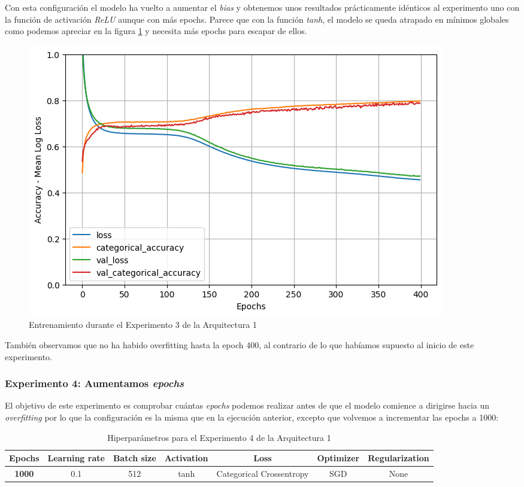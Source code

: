 \documentclass{article}
\begin{document}
			Con esta configuraci\'on el modelo ha vuelto a aumentar el \textit{bias} y obtenemos unos resultados pr\'acticamente id\'enticos al experimento uno con la funci\'on de activaci\'on \textit{ReLU} aunque con m\'as epochs. Parece que con la funci\'on \textit{tanh}, el modelo se queda atrapado en m\'inimos globales como podemos apreciar en la figura \ref{d-tr-a1-e3} y necesita m\'as epochs para escapar de ellos.\\
			
			\begin{figure}[!h]
				\begin{center}
					\includegraphics[scale=0.5]{d-tr-a1-e3.png}		
					\caption{Entrenamiento durante el Experimento 3 de la Arquitectura 1}	
					\label{d-tr-a1-e3}
				\end{center}
			\end{figure}
			
			Tambi\'en observamos que no ha habido overfitting hasta la epoch 400, al contrario de lo que hab\'iamos supuesto al inicio de este experimento.
			
		\subsubsection{Experimento 4: Aumentamos \textit{epochs}}
		\label{d-s-a1-e4}
			El objetivo de este experimento es comprobar cu\'antas \textit{epochs} podemos realizar antes de que el modelo comience a dirigirse hacia un \textit{overfitting} por lo que la configuraci\'on es la misma que en la ejecuci\'on anterior, excepto que volvemos a incrementar las epochs a 1000:
			\begin{table}[!h]
				\begin{center}
					\begin{tabular}{| c | c | c | c | c | c | c |}
						\textbf{Epochs} & \textbf{Learning rate} & \textbf{Batch size} & \textbf{Activation} & \textbf{Loss} & \textbf{Optimizer} & \textbf{Regularization} \\ \hline
						\textbf{1000} & 0.1 & 512 & tanh & Categorical Crossentropy & SGD & None
					\end{tabular}
					\caption{Hiperpar\'ametros para el Experimento 4 de la Arquitectura 1}
					\label{tab:hip-d-a1-e4}
				\end{center}
			\end{table}
			
\end{document}
